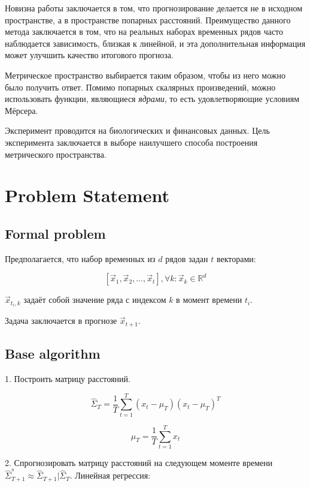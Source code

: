 \documentclass{article}
\begin{document}
	Новизна работы заключается в том, что прогнозирование делается не в исходном пространстве, а в пространстве попарных расстояний. Преимущество данного метода заключается в том, что на реальных наборах временных рядов часто наблюдается зависимость, близкая к линейной, и эта дополнительная информация может улучшить качество итогового прогноза.
	
	Метрическое пространство выбирается таким образом, чтобы из него можно было получить ответ. Помимо попарных скалярных произведений, можно использовать функции, являющиеся \textit{ядрами}, то есть удовлетворяющие условиям Мёрсера.
	
	Эксперимент проводится на биологических и финансовых данных. Цель эксперимента заключается в выборе наилучшего способа построения метрического пространства.

\section{Problem Statement}

\subsection{Formal problem}

Предполагается, что набор временных из $d$ рядов задан $t$ векторами:

$$[\vec{x}_1, \vec{x}_2, \ldots, \vec{x}_t], \forall k: \vec{x}_k \in \mathbb{R}^d $$

$\vec{x}_{t_i, k}$ задаёт собой значение ряда с индексом $k$ в момент времени $t_i$.

Задача заключается в прогнозе $\vec{x}_{t+1}$.

\subsection{Base algorithm}

1. Построить матрицу расстояний.

\begin{equation}
	\hat{\Sigma}_T = \frac{1}{T} \sum_{t=1}^{T} (x_t - \mu_T)(x_t - \mu_T)^T
\end{equation}

\begin{equation}
	\mu_T = \frac{1}{T} \sum_{t=1}^{T} x_t
\end{equation}

2. Спрогнозировать матрицу расстояний на следующем моменте времени $\hat{\Sigma}_{T+1}^s \approx \hat{\Sigma}_{T+1} | \hat{\Sigma}_{T}$. Линейная регрессия:
\end{document}
